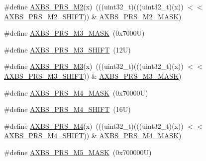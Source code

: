 \begin{DoxyCompactItemize}
\#define \mbox{\hyperlink{group___a_x_b_s___register___masks_gadd7d2a1cebd1400511024fb5bbae6738}{A\+X\+B\+S\+\_\+\+P\+R\+S\+\_\+\+M2}}(x)~(((uint32\+\_\+t)(((uint32\+\_\+t)(x)) $<$$<$ \mbox{\hyperlink{group___a_x_b_s___register___masks_gacf78955a5852e31c71c1542d873df6b3}{A\+X\+B\+S\+\_\+\+P\+R\+S\+\_\+\+M2\+\_\+\+S\+H\+I\+FT}})) \& \mbox{\hyperlink{group___a_x_b_s___register___masks_gacd2feac8facc9d0b21f438eef172fd81}{A\+X\+B\+S\+\_\+\+P\+R\+S\+\_\+\+M2\+\_\+\+M\+A\+SK}})
\item 
\#define \mbox{\hyperlink{group___a_x_b_s___register___masks_gab4b4274fe732ec08377a17c98fcb3c89}{A\+X\+B\+S\+\_\+\+P\+R\+S\+\_\+\+M3\+\_\+\+M\+A\+SK}}~(0x7000\+U)
\item 
\#define \mbox{\hyperlink{group___a_x_b_s___register___masks_gaf63a98f7cff8ba76061096736d5fa14e}{A\+X\+B\+S\+\_\+\+P\+R\+S\+\_\+\+M3\+\_\+\+S\+H\+I\+FT}}~(12\+U)
\item 
\#define \mbox{\hyperlink{group___a_x_b_s___register___masks_ga4bfe54e316bfb646da18888894d3bf53}{A\+X\+B\+S\+\_\+\+P\+R\+S\+\_\+\+M3}}(x)~(((uint32\+\_\+t)(((uint32\+\_\+t)(x)) $<$$<$ \mbox{\hyperlink{group___a_x_b_s___register___masks_gaf63a98f7cff8ba76061096736d5fa14e}{A\+X\+B\+S\+\_\+\+P\+R\+S\+\_\+\+M3\+\_\+\+S\+H\+I\+FT}})) \& \mbox{\hyperlink{group___a_x_b_s___register___masks_gab4b4274fe732ec08377a17c98fcb3c89}{A\+X\+B\+S\+\_\+\+P\+R\+S\+\_\+\+M3\+\_\+\+M\+A\+SK}})
\item 
\#define \mbox{\hyperlink{group___a_x_b_s___register___masks_ga489c3dd8930bf3ada2f36146c4e3bc61}{A\+X\+B\+S\+\_\+\+P\+R\+S\+\_\+\+M4\+\_\+\+M\+A\+SK}}~(0x70000\+U)
\item 
\#define \mbox{\hyperlink{group___a_x_b_s___register___masks_gaa5c41d2e8da4620d83b63f9ffb3878cd}{A\+X\+B\+S\+\_\+\+P\+R\+S\+\_\+\+M4\+\_\+\+S\+H\+I\+FT}}~(16\+U)
\item 
\#define \mbox{\hyperlink{group___a_x_b_s___register___masks_ga637ca78f6d0fbd7625a0e14786664b44}{A\+X\+B\+S\+\_\+\+P\+R\+S\+\_\+\+M4}}(x)~(((uint32\+\_\+t)(((uint32\+\_\+t)(x)) $<$$<$ \mbox{\hyperlink{group___a_x_b_s___register___masks_gaa5c41d2e8da4620d83b63f9ffb3878cd}{A\+X\+B\+S\+\_\+\+P\+R\+S\+\_\+\+M4\+\_\+\+S\+H\+I\+FT}})) \& \mbox{\hyperlink{group___a_x_b_s___register___masks_ga489c3dd8930bf3ada2f36146c4e3bc61}{A\+X\+B\+S\+\_\+\+P\+R\+S\+\_\+\+M4\+\_\+\+M\+A\+SK}})
\item 
\#define \mbox{\hyperlink{group___a_x_b_s___register___masks_ga6fe3afeef7171b168ddfa8341c88b0dc}{A\+X\+B\+S\+\_\+\+P\+R\+S\+\_\+\+M5\+\_\+\+M\+A\+SK}}~(0x700000\+U)
\item 
$$
\end{DoxyCompactItemize}
